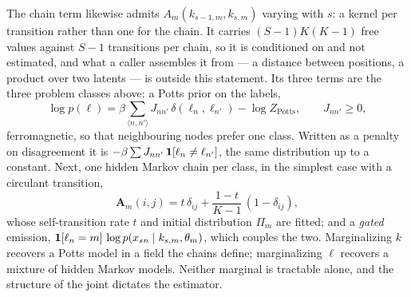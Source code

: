 \documentclass[11pt,a4paper]{article}
\begin{document}
The chain term likewise admits $A_m(k_{s-1,m}, k_{s,m})$ varying with $s$: a
kernel per transition rather than one for the chain. It carries
$(S-1)K(K-1)$ free values against $S-1$ transitions per chain, so it is
conditioned on and not estimated, and what a caller assembles it from --- a
distance between positions, a product over two latents --- is outside this
statement. Its three terms are the three problem
classes above: a Potts prior on the labels,
\begin{equation}
  \log p(\ell) = \beta \sum_{\langle n,n' \rangle} J_{nn'}\,\delta(\ell_n, \ell_{n'})
                 - \log Z_{\mathrm{Potts}},
  \qquad J_{nn'} \ge 0,
  \label{eq:spatial-prior}
\end{equation}
ferromagnetic, so that neighbouring nodes prefer one class. Written as a
penalty on disagreement it is $-\beta \sum J_{nn'}\,
\mathbf{1}[\ell_n \ne \ell_{n'}]$, the same distribution up to a constant.
Next, one hidden Markov chain per class, in the simplest case with a
circulant transition,
\begin{equation}
  \mathbf{A}_m(i, j) = t\,\delta_{ij} + \frac{1 - t}{K - 1}\,(1 - \delta_{ij}),
  \label{eq:circulant}
\end{equation}
whose self-transition rate $t$ and initial distribution $\Pi_m$ are fitted;
and a \emph{gated} emission, $\mathbf{1}[\ell_n = m]\,\log p(x_{sn} \mid k_{s,m},
\theta_m)$, which couples the two. Marginalizing $k$ recovers a Potts model in
a field the chains define; marginalizing $\ell$ recovers a mixture of hidden
Markov models. Neither marginal is tractable alone, and the structure of the
joint dictates the estimator.
\end{document}
